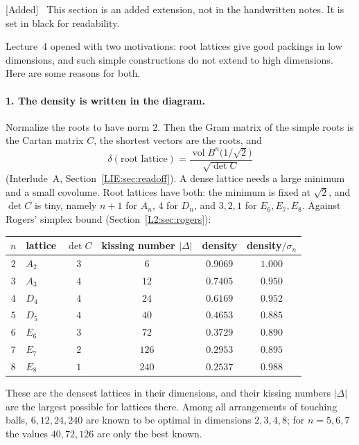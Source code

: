 \documentclass[11pt,openany]{book}
\theoremstyle{plain}
\theoremstyle{definition}
\theoremstyle{remark}
\newenvironment{addedblock}{\par\color{addcol}\noindent\textsf{\small[Added]}\ }{\par}
\newcommand{\vol}{\operatorname{vol}}
\newcommand{\abs}[1]{\left\lvert #1 \right\rvert}
\newcommand{\dens}{\delta}             %
\newcommand{\Ball}{B}                  %
\begin{document}
\begin{addedblock}
This section is an added extension, not in the handwritten notes. It is set in black for readability.
\end{addedblock}

Lecture~4 opened with two motivations: root lattices give good packings in low dimensions, and such
simple constructions do not extend to high dimensions. Here are some reasons for both.

\paragraph{1. The density is written in the diagram.} Normalize the roots to have norm $2$. Then the
Gram matrix of the simple roots is the Cartan matrix $C$, the shortest vectors are the roots, and
\[
  \dens(\text{root lattice})=\frac{\vol\Ball^n\big(1/\sqrt2\big)}{\sqrt{\det C}}
\]
(Interlude~A, Section~\ref{LIE:sec:readoff}). A dense lattice needs a large minimum and a small
covolume. Root lattices have both: the minimum is fixed at $\sqrt2$, and $\det C$ is tiny, namely
$n+1$ for $A_n$, $4$ for $D_n$, and $3,2,1$ for $E_6,E_7,E_8$. Against Rogers' simplex bound
(Section~\ref{L2:sec:rogers}):
\begin{center}
\renewcommand{\arraystretch}{1.15}
\begin{tabular}{clcccc}
\toprule
$n$ & lattice & $\det C$ & kissing number $\abs{\Delta}$ & density & density$/\sigma_n$\\
\midrule
$2$ & $A_2$ & $3$ & $6$ & $0.9069$ & $1.000$\\
$3$ & $A_3$ & $4$ & $12$ & $0.7405$ & $0.950$\\
$4$ & $D_4$ & $4$ & $24$ & $0.6169$ & $0.952$\\
$5$ & $D_5$ & $4$ & $40$ & $0.4653$ & $0.885$\\
$6$ & $E_6$ & $3$ & $72$ & $0.3729$ & $0.890$\\
$7$ & $E_7$ & $2$ & $126$ & $0.2953$ & $0.895$\\
$8$ & $E_8$ & $1$ & $240$ & $0.2537$ & $0.988$\\
\bottomrule
\end{tabular}
\end{center}
These are the densest lattices in their dimensions, and their kissing numbers $\abs{\Delta}$ are the
largest possible for lattices there. Among all arrangements of touching balls, $6,12,24,240$ are known to
be optimal in dimensions $2,3,4,8$; for $n=5,6,7$ the values $40,72,126$ are only the best known.
\end{document}
